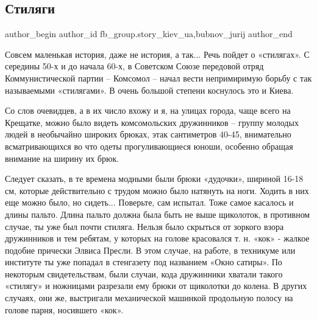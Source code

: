  
 
 
 
 
 
\subsection{Стиляги}
\label{sec:11_11_2021.fb.fb_group.story_kiev_ua.3.stiljagi}
 
\ifcmt
 author_begin
   author_id fb_group.story_kiev_ua,bubnov_jurij
 author_end
\fi

Совсем маленькая история, даже не история, а так... Речь пойдет о «стилягах». С
середины 50-х и до начала 60-х, в Советском Союзе передовой отряд
Коммунистической партии – Комсомол – начал вести непримиримую борьбу с так
называемыми «стилягами». В очень большой степени коснулось это и Киева. 

\begin{multicols}{2} %
\setlength{\parindent}{0pt}

Со слов
очевидцев, а в их число вхожу и я, на улицах города, чаще всего на Крещатке,
можно было видеть комсомольских дружинников – группу молодых людей в необычайно
широких брюках, этак сантиметров 40-45, внимательно всматривающихся во что
одеты прогуливающиеся юноши, особенно обращая внимание на ширину их брюк.


\end{multicols} %

Следует сказать, в те времена модными были брюки «дудочки», шириной 16-18 см,
которые действительно с трудом можно было натянуть на ноги. Ходить в них еще
можно было, но сидеть... Поверьте, сам испытал. Тоже самое касалось и длины
пальто. Длина пальто должна была быть не выше щиколоток, в противном случае, ты
уже был почти стиляга. Нельзя было скрыться от зоркого взора дружинников и тем
ребятам, у которых на голове красовался т. н. «кок» - жалкое подобие прически
Элвиса Пресли. В этом случае, на работе, в техникуме или институте ты уже
попадал в стенгазету под названием «Окно сатиры». По некоторым свидетельствам,
были случаи, кода дружинники хватали такого «стилягу» и ножницами разрезали ему
брюки от щиколотки до колена. В других случаях, они же, выстригали механической
машинкой продольную полосу на голове парня, носившего «кок».

